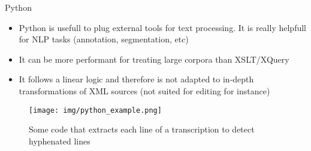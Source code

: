\documentclass[11pt,aspectratio=1610]{beamer}
\begin{document}
\begin{frame}{Python}
\begin{itemize}
\item Python is usefull to plug external tools for text processing. It is really helpfull for NLP tasks (annotation, segmentation, etc)
\item It can be more performant for treating large corpora than XSLT/XQuery
\item It follows a linear logic and therefore is not adapted to in-depth transformations of XML sources (not suited for editing for instance)
\end{itemize}
\begin{center}
\begin{figure}
\texttt{[image: img/python\_example.png]}
\caption{Some code that extracts each line of a transcription to detect hyphenated lines}
\end{figure}
\end{center}
\end{frame}



\begin{frame}[allowframebreaks]
\nocite{*}
\printbibliography
\end{frame}
\end{document}
